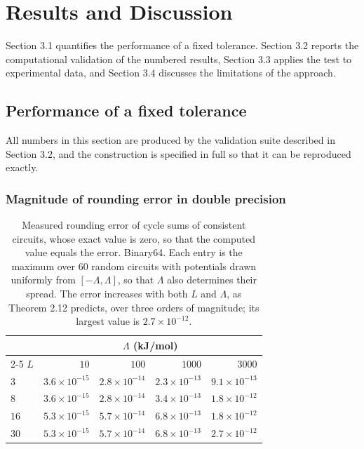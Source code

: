 \documentclass[11pt,a4paper]{article}
\theoremstyle{pstyle}
\theoremstyle{definition}
\theoremstyle{remark}
\begin{document}
\section{Results and Discussion}
\label{sec:results}

Section 3.1 quantifies the performance of a fixed
tolerance. Section 3.2 reports the computational validation
of the numbered results, Section 3.3 applies the test to
experimental data, and Section 3.4 discusses the limitations of
the approach.

\subsection{Performance of a fixed tolerance}
\label{sec:fixed-tolerance-fails}

All numbers in this section are produced by the validation suite
described in Section 3.2, and the construction is specified in
full so that it can be reproduced exactly.

\subsubsection{Magnitude of rounding error in double precision}

\begin{table}[t]
\centering\small
\caption{Measured rounding error of cycle sums of consistent circuits,
whose exact value is zero, so that the computed value equals the error.
Binary64. Each entry is the maximum over $60$ random circuits with
potentials drawn uniformly from $[-\Lambda,\Lambda]$, so that $\Lambda$
also determines their spread. The error increases with both $L$ and
$\Lambda$, as Theorem 2.12 predicts, over three orders of
magnitude; its largest value is $2.7\times10^{-12}$.}
\label{tab:v1}
\begin{tabular}{@{}lrrrr@{}}
\toprule
& \multicolumn{4}{c}{$\Lambda$ (kJ/mol)}\\
\cmidrule(l){2-5}
$L$ & $10$ & $100$ & $1000$ & $3000$\\
\midrule
$3$  & $3.6\times10^{-15}$ & $2.8\times10^{-14}$ & $2.3\times10^{-13}$ & $9.1\times10^{-13}$\\
$8$  & $3.6\times10^{-15}$ & $2.8\times10^{-14}$ & $3.4\times10^{-13}$ & $1.8\times10^{-12}$\\
$16$ & $5.3\times10^{-15}$ & $5.7\times10^{-14}$ & $6.8\times10^{-13}$ & $1.8\times10^{-12}$\\
$30$ & $5.3\times10^{-15}$ & $5.7\times10^{-14}$ & $6.8\times10^{-13}$ & $2.7\times10^{-12}$\\
\bottomrule
\end{tabular}
\end{table}
\end{document}
